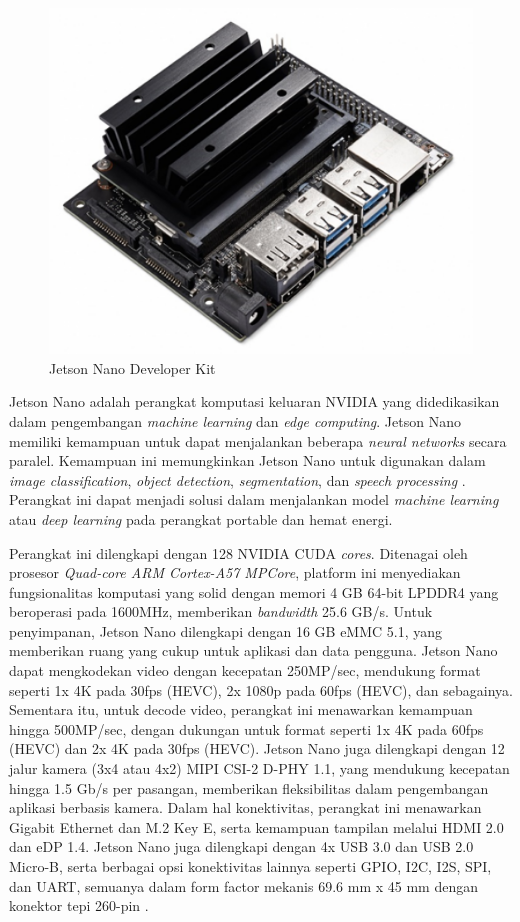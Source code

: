  \begin{figure}[H]
  \centering
  \includegraphics[scale=0.7]{gambar/bab2-jetson-nano.png}
  \caption{Jetson Nano Developer Kit}
  \label{fig:jetsonnano}
\end{figure}

Jetson Nano adalah perangkat komputasi keluaran NVIDIA yang didedikasikan dalam pengembangan \textit{machine learning} dan \emph{edge computing}. Jetson Nano memiliki kemampuan untuk dapat menjalankan beberapa \emph{neural networks} secara paralel. Kemampuan ini memungkinkan Jetson Nano untuk digunakan dalam \textit{image classification}, \textit{object detection}, \textit{segmentation}, dan \textit{speech processing} \parencite{nvidiaJetsonNano}. Perangkat ini dapat menjadi solusi dalam menjalankan model \textit{machine learning} atau \textit{deep learning} pada perangkat portable dan hemat energi. 

Perangkat ini dilengkapi dengan 128 NVIDIA CUDA \emph{cores}. Ditenagai oleh prosesor \emph{Quad-core ARM Cortex-A57 MPCore}, platform ini menyediakan fungsionalitas komputasi yang solid dengan memori 4 GB 64-bit LPDDR4 yang beroperasi pada 1600MHz, memberikan \emph{bandwidth} 25.6 GB/s. Untuk penyimpanan, Jetson Nano dilengkapi dengan 16 GB eMMC 5.1, yang memberikan ruang yang cukup untuk aplikasi dan data pengguna. Jetson Nano dapat mengkodekan video dengan kecepatan 250MP/sec, mendukung format seperti 1x 4K pada 30fps (HEVC), 2x 1080p pada 60fps (HEVC), dan sebagainya. Sementara itu, untuk decode video, perangkat ini menawarkan kemampuan hingga 500MP/sec, dengan dukungan untuk format seperti 1x 4K pada 60fps (HEVC) dan 2x 4K pada 30fps (HEVC). Jetson Nano juga dilengkapi dengan 12 jalur kamera (3x4 atau 4x2) MIPI CSI-2 D-PHY 1.1, yang mendukung kecepatan hingga 1.5 Gb/s per pasangan, memberikan fleksibilitas dalam pengembangan aplikasi berbasis kamera. Dalam hal konektivitas, perangkat ini menawarkan Gigabit Ethernet dan M.2 Key E, serta kemampuan tampilan melalui HDMI 2.0 dan eDP 1.4. Jetson Nano juga dilengkapi dengan 4x USB 3.0 dan USB 2.0 Micro-B, serta berbagai opsi konektivitas lainnya seperti GPIO, I2C, I2S, SPI, dan UART, semuanya dalam form factor mekanis 69.6 mm x 45 mm dengan konektor tepi 260-pin \parencite{nvidiaJetsonNano}.

